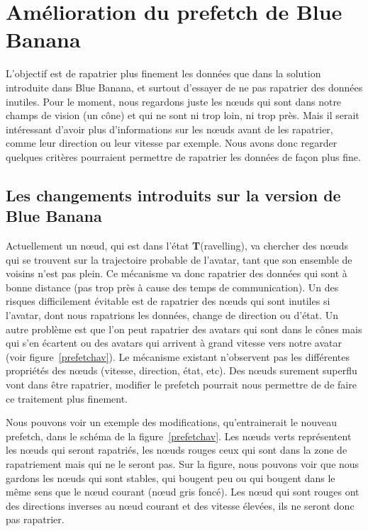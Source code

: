 \section{Amélioration du prefetch de Blue Banana}

L'objectif  est de rapatrier plus finement les données que dans la solution introduite dans Blue Banana, et surtout d'essayer de ne pas rapatrier des données inutiles. Pour le moment, nous regardons juste les nœuds qui sont dans notre champs de vision (un cône) et qui ne sont ni trop loin, ni trop près. Mais il serait intéressant d'avoir plus d'informations sur les nœuds avant de les rapatrier, comme leur direction ou leur vitesse par exemple. Nous avons donc regarder quelques critères pourraient permettre de rapatrier les données de façon plus fine.

\subsection{Les changements introduits sur la version de Blue Banana}


\par Actuellement un nœud, qui est dans l'état \textbf{T}(ravelling), va chercher des nœuds qui se trouvent sur la trajectoire probable de l'avatar, tant que son ensemble de voisins n'est pas plein. Ce mécanisme va donc rapatrier des données qui sont à bonne distance (pas trop près à cause des temps de communication). Un des risques difficilement évitable est de rapatrier des nœuds qui sont inutiles si l'avatar, dont nous rapatrions les données, change de direction ou d'état. Un autre problème est que l'on peut rapatrier des avatars qui sont dans le cônes mais qui s'en écartent ou des avatars qui arrivent à grand vitesse vers notre avatar (voir figure~\ref{prefetchav}). Le mécanisme existant n'observent pas les différentes propriétés des nœuds (vitesse, direction, état, etc). Des nœuds surement superflu vont dans être rapatrier, modifier le prefetch pourrait nous permettre de de faire ce traitement plus finement.

\par  Nous pouvons voir un exemple des modifications, qu'entrainerait le nouveau prefetch, dans le schéma de la figure~\ref{prefetchav}. Les nœuds verts représentent les nœuds qui seront rapatriés, les nœuds rouges ceux qui sont dans la zone de rapatriement mais qui ne le seront pas. Sur la figure, nous pouvons voir que nous gardons les nœuds qui sont stables, qui bougent peu ou qui bougent dans le même sens que le nœud courant (nœud gris foncé). Les nœud qui sont rouges ont des directions inverses au nœud courant et des vitesse élevées, ils ne seront donc pas rapatrier.

